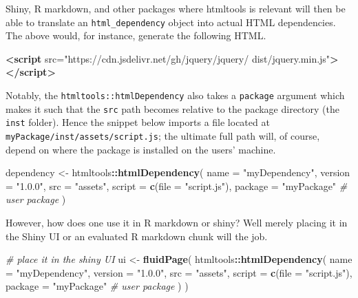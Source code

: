 \documentclass[
  10pt,
]{krantz}
\makeatletter
\newenvironment{Shaded}{\begin{snugshade}}{\end{snugshade}}
\newcommand{\CommentTok}[1]{\textcolor[rgb]{0.37,0.37,0.37}{\textit{#1}}}
\newcommand{\DataTypeTok}[1]{\textcolor[rgb]{0.27,0.27,0.27}{#1}}
\newcommand{\KeywordTok}[1]{\textcolor[rgb]{0.27,0.27,0.27}{\textbf{#1}}}
\newcommand{\NormalTok}[1]{#1}
\newcommand{\OperatorTok}[1]{\textcolor[rgb]{0.43,0.43,0.43}{\textbf{#1}}}
\newcommand{\OtherTok}[1]{\textcolor[rgb]{0.37,0.37,0.37}{#1}}
\newcommand{\StringTok}[1]{\textcolor[rgb]{0.5,0.5,0.5}{#1}}
\newenvironment{kframe}{%
\medskip{}
\setlength{\fboxsep}{.8em}
 \def\at@end@of@kframe{}%
 \ifinner\ifhmode%
  \def\at@end@of@kframe{\end{minipage}}%
  \begin{minipage}{\columnwidth}%
 \fi\fi%
 \def\FrameCommand##1{\hskip\@totalleftmargin \hskip-\fboxsep
 \colorbox{shadecolor}{##1}\hskip-\fboxsep
     \hskip-\linewidth \hskip-\@totalleftmargin \hskip\columnwidth}%
 \MakeFramed {\advance\hsize-\width
   \@totalleftmargin\z@ \linewidth\hsize
   \@setminipage}}%
 {\par\unskip\endMakeFramed%
 \at@end@of@kframe}
\renewenvironment{Shaded}{\begin{kframe}}{\end{kframe}}
\makeatother
\begin{document}
Shiny, R markdown, and other packages where htmltools is relevant will then be able to translate an \texttt{html\_dependency} object into actual HTML dependencies. The above would, for instance, generate the following HTML.

\begin{Shaded}
\begin{Highlighting}[]
\KeywordTok{<script} 
\OtherTok{  src=}\StringTok{"https://cdn.jsdelivr.net/gh/jquery/jquery/}
\StringTok{    dist/jquery.min.js"}\KeywordTok{>}
\KeywordTok{</script>}
\end{Highlighting}
\end{Shaded}

Notably, the \texttt{htmltools::htmlDependency} also takes a \texttt{package} argument which makes it such that the \texttt{src} path becomes relative to the package directory (the \texttt{inst} folder). Hence the snippet below imports a file located at \texttt{myPackage/inst/assets/script.js}; the ultimate full path will, of course, depend on where the package is installed on the users' machine.

\begin{Shaded}
\begin{Highlighting}[]
\NormalTok{dependency <{-}}\StringTok{ }\NormalTok{htmltools}\OperatorTok{::}\KeywordTok{htmlDependency}\NormalTok{(}
  \DataTypeTok{name =} \StringTok{"myDependency"}\NormalTok{,}
  \DataTypeTok{version =} \StringTok{"1.0.0"}\NormalTok{,}
  \DataTypeTok{src =} \StringTok{"assets"}\NormalTok{,}
  \DataTypeTok{script =} \KeywordTok{c}\NormalTok{(}\DataTypeTok{file =} \StringTok{"script.js"}\NormalTok{),}
  \DataTypeTok{package =} \StringTok{"myPackage"} \CommentTok{\# user package}
\NormalTok{)}
\end{Highlighting}
\end{Shaded}

However, how does one use it in R markdown or shiny? Well merely placing it in the Shiny UI or an evaluated R markdown chunk will the job.

\begin{Shaded}
\begin{Highlighting}[]
\CommentTok{\# place it in the shiny UI}
\NormalTok{ui <{-}}\StringTok{ }\KeywordTok{fluidPage}\NormalTok{(}
\NormalTok{  htmltools}\OperatorTok{::}\KeywordTok{htmlDependency}\NormalTok{(}
    \DataTypeTok{name =} \StringTok{"myDependency"}\NormalTok{,}
    \DataTypeTok{version =} \StringTok{"1.0.0"}\NormalTok{,}
    \DataTypeTok{src =} \StringTok{"assets"}\NormalTok{,}
    \DataTypeTok{script =} \KeywordTok{c}\NormalTok{(}\DataTypeTok{file =} \StringTok{"script.js"}\NormalTok{),}
    \DataTypeTok{package =} \StringTok{"myPackage"} \CommentTok{\# user package}
\NormalTok{  )}
\NormalTok{)}
\end{Highlighting}
\end{Shaded}
\end{document}
